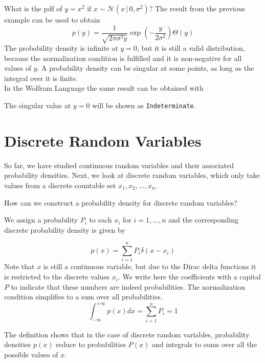 \documentclass{tstextbook}
\begin{document}
\begin{example}
What is the pdf of $y=x^2$ if $x\sim \mathcal{N}(x\,\vert\, 0,\sigma^2)$? The result from the previous example can be used to obtain
  \begin{equation}
    p(y)=\frac{1}{\sqrt{2\pi\sigma^2 y}}\exp\left(-\frac{y}{2\sigma^2}\right)\Theta(y)
  \end{equation}
  The probability density is infinite at $y=0$, but it is still a valid distribution, because the normalization condition is fulfilled and it is non-negative for all values of $y$. A probability density can be singular at some points, as long as the integral over it is finite.\\

In the Wolfram Language the same result can be obtained with
\begin{mathematica}
dist = TransformedDistribution[x^2, x \[Distributed] NormalDistribution[0,\[Sigma]]];
PDF[dist, y]
\end{mathematica}

The singular value at $y=0$ will be shown as \texttt{Indeterminate}.

\end{example}  

\section{Discrete Random Variables}
So far, we have studied continuous random variables and their associated probability densities. Next, we look at discrete random variables, which only take values from a discrete countable set $x_1,x_2,\ldots,x_n$.

How can we construct a probability density for discrete random variables?

We assign a probability $P_i$ to each $x_i$ for $i=1,\ldots,n$ and the corresponding discrete probability density is given by

\begin{definition}
  \label{th:discreteprobabilitydensity}
  \begin{equation}
    p(x)=\sum_{i=1}^{n}P_i\delta\left(x-x_i\right)
  \end{equation}
  Note that $x$ is still a continuous variable, but due to the Dirac delta functions it is restricted to the discrete values $x_i$. We write here the coefficients with a capital $P$ to indicate that these numbers are indeed probabilities.
The normalization condition simplifies to a sum over all probabilities.
     \begin{equation}
    \int_{-\infty}^{+\infty}p(x)dx=\sum_{i=1}^{n}P_i=1
  \end{equation}
\end{definition}
The definition shows that in the case of discrete random variables, probability densities $p(x)$ reduce to probabilities $P(x)$ and integrals to sums over all the possible values of $x$.
\end{document}
